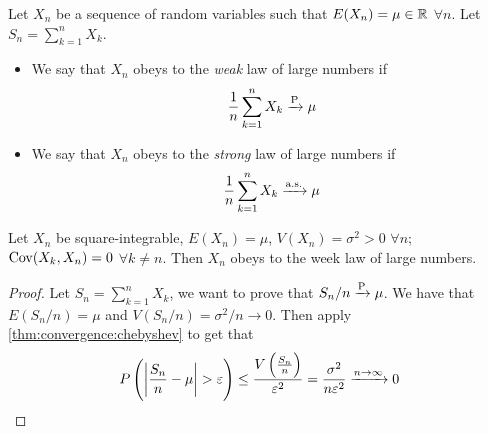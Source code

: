 \documentclass[12pt]{extarticle}
\newcommand{\cov}{{\operatorfont Cov}}
\newcommand{\convas}{\xrightarrow{\operatorfont a.s.}}
\newcommand{\convprob}{\xrightarrow{\operatorfont P}}
\begin{document}
\begin{definition}
    Let $X_n$ be a sequence of random variables such that $E(X_n) = \mu \in \mathbb{R}$ $\forall n$.
    Let $S_n = \sum_{k = 1}^n X_k$.
    \begin{itemize}
        \item We say that $X_n$ obeys to the \emph{weak} law of large numbers if
              \begin{equation}
                  \frac{1}{n} \sum^n_{k = 1} X_k \convprob \mu
              \end{equation}
        \item We say that $X_n$ obeys to the \emph{strong} law of large numbers if
              \begin{equation}
                  \frac{1}{n} \sum^n_{k = 1} X_k \convas \mu
              \end{equation}
    \end{itemize}
\end{definition}

\begin{theorem}
    Let $X_n$ be square-integrable, $E(X_n) = \mu$, $V(X_n) = \sigma^2 > 0$ $\forall n$; $\cov(X_k, X_n) = 0$ $\forall k \neq n$.
    Then $X_n$ obeys to the week law of large numbers.
\end{theorem}

\begin{proof}
    Let $S_n = \sum_{k = 1}^n X_k$, we want to prove that $S_n/n \convprob \mu$.
    We have that $E(S_n/n) = \mu$ and $V(S_n/n) = \sigma^2 /n \to 0$.
    Then apply \autoref{thm:convergence:chebyshev} to get that
    \begin{equation}
        P\left(\abs{\frac{S_n}{n} - \mu} > \varepsilon\right) \leq \frac{V\left(\frac{S_n}{n}\right)}{\varepsilon^2} = \frac{\sigma^2}{n \varepsilon^2} \xrightarrow{n \to \infty} 0
    \end{equation}
\end{proof}
\end{document}
